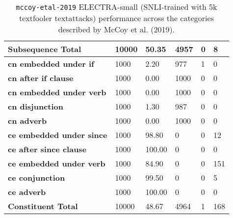 \documentclass[11pt,a4paper]{article}
\begin{document}
\begin{table}[!hbt]
\begin{tabular}{p{}|p{} p{} p{} p{} p{} }
        \textbf{Subsequence Total} & 10000 & 50.35 & 4957 & 0 & 8 \\
        \hline
        \textbf{cn embedded under if} & 1000 & 2.20 & 977 & 1 & 0 \\
        \textbf{cn after if clause} & 1000 & 0.00 & 1000 & 0 & 0 \\
        \textbf{cn embedded under verb} & 1000 & 0.00 & 1000 & 0 & 0 \\
        \textbf{cn disjunction} & 1000 & 1.30 & 987 & 0 & 0 \\
        \textbf{cn adverb} & 1000 & 0.00 & 1000 & 0 & 0 \\
        \textbf{ce embedded under since} & 1000 & 98.80 & 0 & 0 & 12 \\
        \textbf{ce after since clause} & 1000 & 100.00 & 0 & 0 & 0 \\
        \textbf{ce embedded under verb} & 1000 & 84.90 & 0 & 0 & 151 \\
        \textbf{ce conjunction} & 1000 & 99.50 & 0 & 0 & 5 \\
        \textbf{ce adverb} & 1000 & 100.00 & 0 & 0 & 0 \\
        \textbf{Constituent Total} & 10000 & 48.67 & 4964 & 1 & 168 \\
    \end{tabular}
    \caption{\texttt{mccoy-etal-2019} ELECTRA-small (SNLI-trained with 5k textfooler textattacks) performance across the categories described by McCoy et al. (2019).}
\end{table}
\end{document}
